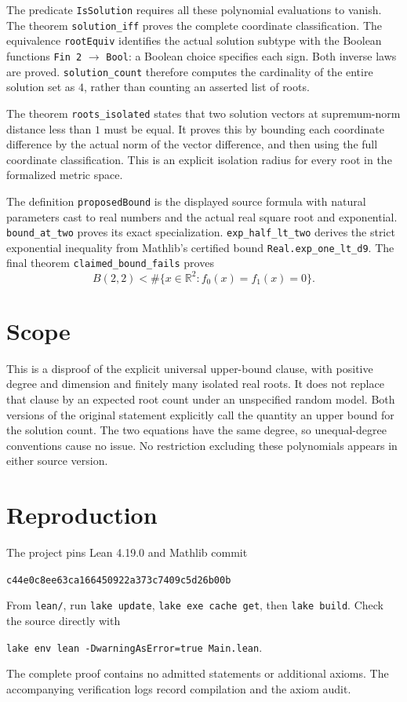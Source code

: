 \documentclass[11pt]{article}
\begin{document}
The predicate \texttt{IsSolution} requires all these polynomial evaluations
to vanish. The theorem \texttt{solution\_iff} proves the complete coordinate
classification. The equivalence \texttt{rootEquiv} identifies the actual
solution subtype with the Boolean functions \texttt{Fin 2} $\to$ \texttt{Bool}:
a Boolean choice specifies each sign. Both inverse laws are proved.
\texttt{solution\_count} therefore computes the cardinality of the entire
solution set as $4$, rather than counting an asserted list of roots.

The theorem \texttt{roots\_isolated} states that two solution vectors at
supremum-norm distance less than $1$ must be equal. It proves this by bounding
each coordinate difference by the actual norm of the vector difference,
and then using the full coordinate classification. This is an explicit
isolation radius for every root in the formalized metric space.

The definition \texttt{proposedBound} is the displayed source formula with
natural parameters cast to real numbers and the actual real square root and
exponential. \texttt{bound\_at\_two} proves its exact specialization.
\texttt{exp\_half\_lt\_two} derives the strict exponential inequality from
Mathlib's certified bound \texttt{Real.exp\_one\_lt\_d9}.
The final theorem \texttt{claimed\_bound\_fails} proves
\[
 B(2,2)<\#\{x\in\mathbb R^2:f_0(x)=f_1(x)=0\}.
\]

\section*{Scope}
This is a disproof of the explicit universal upper-bound clause, with
positive degree and dimension and finitely many isolated real roots.
It does not replace that clause by an expected root count under an
unspecified random model. Both versions of the original statement explicitly
call the quantity an upper bound for the solution count. The two equations
have the same degree, so unequal-degree conventions cause no issue.
No restriction excluding these polynomials appears in either source version.

\section*{Reproduction}
The project pins Lean 4.19.0 and Mathlib commit
\begin{center}\small\texttt{c44e0c8ee63ca166450922a373c7409c5d26b00b}\end{center}
From \texttt{lean/}, run \texttt{lake update}, \texttt{lake exe cache get},
then \texttt{lake build}. Check the source directly with
\begin{center}\small\texttt{lake env lean -DwarningAsError=true Main.lean}.\end{center}
The complete proof contains no admitted statements or additional axioms.
The accompanying verification logs record compilation and the axiom audit.
\end{document}
